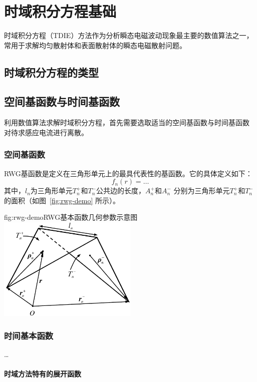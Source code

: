 \chapter{时域积分方程基础}

时域积分方程（TDIE）方法作为分析瞬态电磁波动现象最主要的数值算法之一，
常用于求解均匀散射体和表面散射体的瞬态电磁散射问题。

\section{时域积分方程的类型}

\section{空间基函数与时间基函数}

利用数值算法求解时域积分方程，首先需要选取适当的空间基函数与时间基函数
对待求感应电流进行离散。

\subsection{空间基函数}

RWG基函数是定义在三角形单元上的最具代表性的基函数。它的具体定义如下：
\[ f_n(r) = \text{\ldots} \]
其中，$l_n$为三角形单元$T_n^+$和$T_n^-$公共边的长度，$A_n^+$和$A_n^-$
分别为三角形单元$T_n^+$和$T_n^-$的面积（如图~\ref{fig:rwg-demo} 所示）。

\begin{Figure}{fig:rwg-demo}{RWG基本函数几何参数示意图}
  \includegraphics[width=0.5\textwidth]{ch/02/rwg-demo}
\end{Figure}

\subsection{时间基本函数}

\ldots

\subsubsection{时域方法特有的展开函数}

